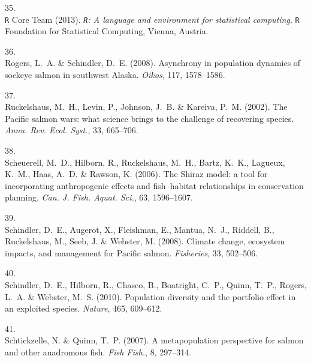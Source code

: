 \documentclass[11pt]{article}
\begin{document}
\begin{spacing}{1.6}
\begin{thebibliography}{50}
35.\\
{\texttt{R} Core Team} (2013).
\newblock \emph{\texttt{R}: {A} language and environment for statistical
  computing}.
\newblock \texttt{R} Foundation for Statistical Computing, Vienna, Austria.

36.\\
Rogers, L.~A. \& Schindler, D.~E. (2008).
\newblock Asynchrony in population dynamics of sockeye salmon in southwest
  {Alaska}.
\newblock \emph{Oikos}, 117, 1578--1586.

37.\\
Ruckelshaus, M.~H., Levin, P., Johnson, J.~B. \& Kareiva, P.~M. (2002).
\newblock The {Pacific} salmon wars: what science brings to the challenge of
  recovering species.
\newblock \emph{Annu. Rev. Ecol. Syst.}, 33, 665--706.

38.\\
Scheuerell, M.~D., Hilborn, R., Ruckelshaus, M.~H., Bartz, K.~K., Lagueux,
  K.~M., Haas, A.~D. \& Rawson, K. (2006).
\newblock The {Shiraz} model: a tool for incorporating anthropogenic effects
  and fish--habitat relationships in conservation planning.
\newblock \emph{Can. J. Fish. Aquat. Sci.}, 63, 1596--1607.

39.\\
Schindler, D.~E., Augerot, X., Fleishman, E., Mantua, N.~J., Riddell, B.,
  Ruckelshaus, M., Seeb, J. \& Webster, M. (2008).
\newblock Climate change, ecosystem impacts, and management for {Pacific}
  salmon.
\newblock \emph{Fisheries}, 33, 502--506.

40.\\
Schindler, D.~E., Hilborn, R., Chasco, B., Boatright, C.~P., Quinn, T.~P.,
  Rogers, L.~A. \& Webster, M.~S. (2010).
\newblock Population diversity and the portfolio effect in an exploited
  species.
\newblock \emph{Nature}, 465, 609--612.

41.\\
Schtickzelle, N. \& Quinn, T.~P. (2007).
\newblock A metapopulation perspective for salmon and other anadromous fish.
\newblock \emph{Fish Fish.}, 8, 297--314.


\end{thebibliography}
\end{spacing}
\end{document}
